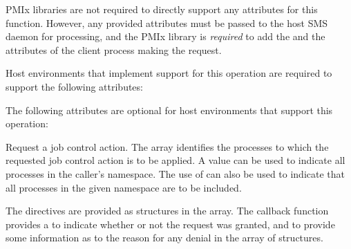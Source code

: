 \reqattrstart
\ac{PMIx} libraries are not required to directly support any attributes for this function. However, any provided attributes must be passed to the host \ac{SMS} daemon for processing, and the \ac{PMIx} library is \textit{required} to add the  and the  attributes of the client process making the request.

\divider

Host environments that implement support for this operation are required to support the following attributes:


\reqattrend

\optattrstart
The following attributes are optional for host environments that support this operation:


\optattrend

\descr

Request a job control action.
The  array identifies the processes to which the requested job control action is to be applied.
A  value can be used to indicate all processes in the caller's namespace.
The use of  can also be used to indicate that all processes in the given namespace are to be included.

The directives are provided as  structures in the  array.
The callback function provides a  to indicate whether or not the request was granted, and to provide some information as to the reason for any denial in the  array of  structures.


